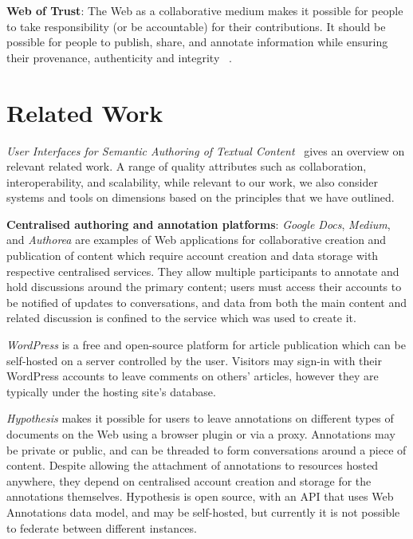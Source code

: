 \documentclass[a4paper]{llncs}
\begin{document}
\par \textbf{Web of Trust}: The Web as a collaborative medium makes it possible for people to take responsibility (or be accountable) for their contributions. It should be possible for people to publish, share, and annotate information while ensuring their provenance, authenticity and integrity ~\cite{ref-5,ref-6,ref-7}.


\section{Related Work}
\label{related-work}
                          
\par \textit{User Interfaces for Semantic Authoring of Textual Content}~\cite{ref-8} gives an overview on relevant related work. A range of quality attributes such as collaboration, interoperability, and scalability, while relevant to our work, we also consider systems and tools on dimensions based on the principles that we have outlined.

                            
\par 
                                \textbf{Centralised authoring and annotation platforms}:
                                \textit{Google Docs}, \textit{Medium}, and \textit{Authorea} are examples of Web applications for collaborative creation and publication of content which require account creation and data storage with respective centralised services. They allow multiple participants to annotate and hold discussions around the primary content; users must access their accounts to be notified of updates to conversations, and data from both the main content and related discussion is confined to the service which was used to create it.

                                \textit{WordPress} is a free and open-source platform for article publication which can be self-hosted on a server controlled by the user. Visitors may sign-in with their WordPress accounts to leave comments on others’ articles, however they are typically under the hosting site’s database.

                                \textit{Hypothesis} makes it possible for users to leave annotations on different types of documents on the Web using a browser plugin or via a proxy. Annotations may be private or public, and can be threaded to form conversations around a piece of content. Despite allowing the attachment of annotations to resources hosted anywhere, they depend on centralised account creation and storage for the annotations themselves. Hypothesis is open source, with an API that uses Web Annotations data model, and may be self-hosted, but currently it is not possible to federate between different instances.
\end{document}
